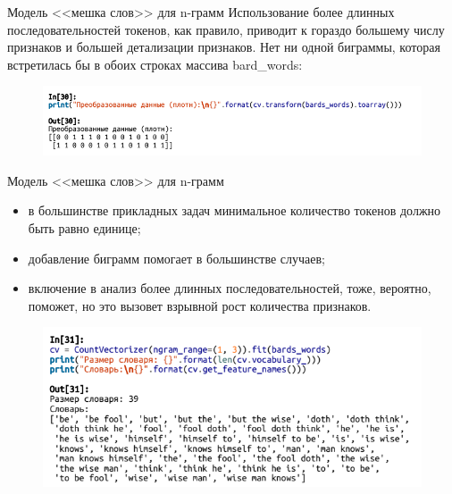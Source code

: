 \documentclass{beamer}
\begin{document}
\begin{frame}{Модель <<мешка слов>> для n-грамм}
Использование более длинных последовательностей токенов, как правило, приводит к гораздо большему числу признаков и большей детализации признаков. Нет ни одной биграммы, которая встретилась бы
в обоих строках массива bard\_words:
\begin{figure}[h]
\centering
\includegraphics[scale=0.75]{images/lec09-pic30.png}
\end{figure}
\end{frame}

\begin{frame}{Модель <<мешка слов>> для n-грамм}
\begin{itemize}
\item в большинстве прикладных задач минимальное количество токенов должно быть равно единице; \item добавление биграмм помогает в большинстве случаев;
\item включение в анализ более длинных последовательностей, тоже,
вероятно, поможет, но это вызовет взрывной рост количества признаков. 
\end{itemize}
\begin{figure}[h]
\centering
\includegraphics[scale=0.5]{images/lec09-pic31.png}
\end{figure}
\end{frame}
\end{document}
